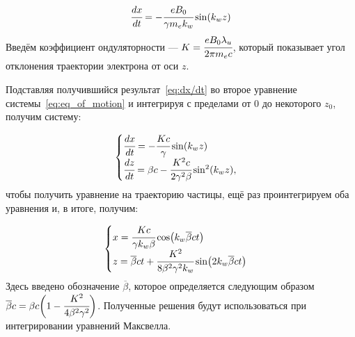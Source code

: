 \begin{equation}
 	\label{eq:dx/dt}
	\cfrac{dx}{dt} = - \cfrac{eB_0}{\gamma m_ek_w} \sin(k_w z)
\end{equation}
Введём коэффициент ондуляторности --- $K = \cfrac{eB_0 \lambda_u}{2 \pi m_e c}$, который показывает угол отклонения траектории электрона от оси $z$. 

Подставляя получившийся результат~\ref{eq:dx/dt} во второе уравнение системы~\ref{eq:eq_of_motion} и интегрируя с пределами от $0$ до некоторого $z_0$, получим систему:

\begin{equation}
	\begin{cases}
	\label{eq:eq_of_motion_velocity}
		\cfrac{dx}{dt} = - \cfrac{Kc}{\gamma} \sin(k_w z)\\
		\cfrac{dz}{dt} = \beta c - \cfrac{K^2 c}{2 \gamma^2 \beta}\sin^2(k_w z),
	\end{cases} 
\end{equation}
чтобы получить уравнение на траекторию частицы, ещё раз проинтегрируем оба уравнения и, в итоге, получим:

\begin{equation}
	\begin{cases}
	\label{eq:eq_of_motion_trej}
		x = \cfrac{Kc}{\gamma k_w \beta} \cos(k_w\overline{\beta}ct)\\
		z = \overline{\beta}ct + \cfrac{K^2}{8 \beta^2 \gamma^2 k_w}\sin(2k_w\overline{\beta}ct) 
	\end{cases} 
\end{equation}
Здесь введено обозначение $\overline{\beta}$, которое определяется следующим образом $\overline{\beta}c = \beta c\bigg(1 - \cfrac{K^2}{4 \beta^2 \gamma^2}\bigg)$. Полученные решения будут использоваться при интегрировании уравнений Максвелла.
